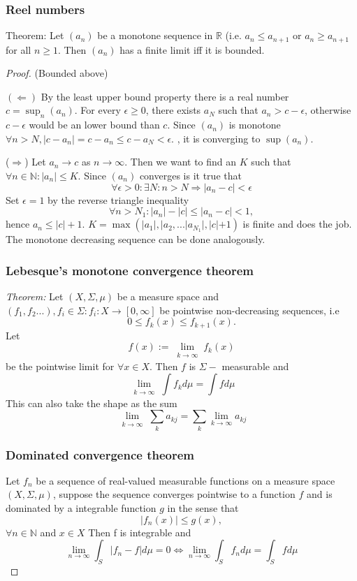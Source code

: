 \documentclass[titlepage]{article}
\begin{document}
\subsubsection{Reel numbers}
Theorem: Let $(a_n)$ be a monotone sequence in $\mathbb{R}$ (i.e. $a_n \leq a_{n+1}$ or $a_n \geq a_{n+1}$ for all $n\geq1$. Then $(a_n)$ has a finite limit iff it is bounded.
\begin{proof}
(Bounded above)

$(\Leftarrow)$
By the least upper bound property there is a real number $c = \sup_n (a_n)$. For every $\epsilon \geq 0$, there exists $a_N$ such that $a_n > c-\epsilon$, otherwise $c-\epsilon$ would be an lower bound than $c$. Since $(a_n)$ is monotone $\forall n>N, |c-a_n| = c-a_n \leq c-a_N < \epsilon.$ , it is converging to $\sup(a_n)$.

($\Rightarrow$) Let $a_n \rightarrow c$ as $n\rightarrow \infty$. Then we want to find an $K$ such that $\forall n \in \mathbb{N}: |a_n|\leq K$. Since $(a_n)$ converges is it true that $$\forall \epsilon >0: \exists N: n>N \Longrightarrow |a_n - c| < \epsilon$$
Set  $\epsilon = 1$ by the reverse triangle inequality
$$\forall n >N_1 : |a_n| - |c| \leq |a_n - c| < 1,$$
hence $a_n \leq |c| + 1$.
$K = \max \left(|a_1|, |a_2, ...|a_{N_1}|, |c|+1\right)$ is finite and does the job. The monotone decreasing sequence can be done analogously.
\subsubsection{Lebesque's monotone convergence theorem}
\textit{Theorem:} Let $(X,\Sigma, \mu)$ be a measure space and $(f_1,f_2...), f_i \in \Sigma : f_i: X \rightarrow [0,\infty]$ be pointwise non-decreasing sequences, i.e
$$ 0 \leq f_k(x) \leq f_{k+1}(x).$$
Let
$$f(x) := \lim\limits_{\substack{k\rightarrow \infty}} f_k(x)$$
be the pointwise limit for $\forall x \in X.$
Then $f$ is $\Sigma-$ measurable and 
\begin{equation}
\lim\limits_{\substack{k\rightarrow \infty}}\int f_k d\mu = \int f d\mu 
\end{equation}
This can also take the shape as the sum
\begin{equation}
\lim\limits_{\substack{k\rightarrow \infty}}\sum_k a_{kj} = \sum_k \lim_{k\rightarrow \infty} a_{kj}
\end{equation}
\subsubsection{Dominated convergence theorem}
 Let $f_n$ be a sequence of real-valued measurable functions on a measure space $(X,\Sigma, \mu)$, suppose the sequence converges pointwise to a function $f$ and is dominated by a integrable function $g$ in the sense that
 \begin{equation}
 |f_n(x)| \leq g(x),
 \end{equation}
 $\forall n\in \mathbb{N}$ and $x\in X$
 Then f is integrable and 
 \begin{equation}
 \lim_{n\rightarrow \infty} \int_S |f_n - f|d\mu = 0 \Longleftrightarrow
 \lim_{n\rightarrow \infty} \int_S f_n d\mu = \int_S f d\mu 
 \end{equation}
 

\end{proof}
\end{document}
